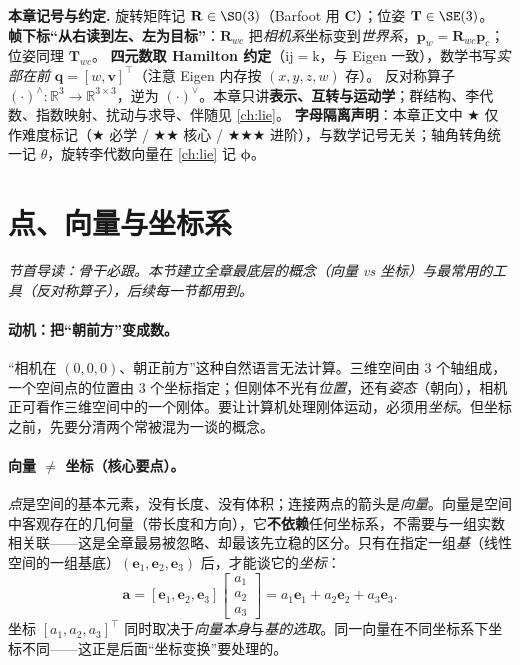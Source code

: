 \begin{note}
\textbf{本章记号与约定.}\;
旋转矩阵记 $\mathbf{R}\in\SO(3)$（Barfoot\cite{barfoot2024state} 用 $\mathbf{C}$）；位姿 $\mathbf{T}\in\SE(3)$。
\textbf{帧下标“从右读到左、左为目标”}：$\mathbf{R}_{wc}$ 把\emph{相机系}坐标变到\emph{世界系}，$\mathbf{p}_w=\mathbf{R}_{wc}\mathbf{p}_c$；位姿同理 $\mathbf{T}_{wc}$。
\textbf{四元数取 Hamilton 约定}（$\mathrm{ij}=\mathrm{k}$，与 Eigen 一致），数学书写\emph{实部在前} $\mathbf{q}=[w,\mathbf{v}]^\top$（注意 Eigen 内存按 $(x,y,z,w)$ 存）。
反对称算子 $(\cdot)^\wedge:\mathbb{R}^3\to\mathbb{R}^{3\times3}$，逆为 $(\cdot)^\vee$。本章只讲\textbf{表示、互转与运动学}；群结构、李代数、指数映射、扰动与求导、伴随见 \cref{ch:lie}。
\textbf{字母隔离声明}：本章正文中 $\bigstar$ 仅作难度标记（$\bigstar$ 必学 / $\bigstar\bigstar$ 核心 / $\bigstar\bigstar\bigstar$ 进阶），与数学记号无关；轴角转角统一记 $\theta$，旋转李代数向量在 \cref{ch:lie} 记 $\boldsymbol{\phi}$。
\end{note}

\section{点、向量与坐标系}
\label{sec:rb-vector}
\noindent\emph{节首导读：骨干必跟。本节建立全章最底层的概念（向量 vs 坐标）与最常用的工具（反对称算子），后续每一节都用到。}

\paragraph{动机：把“朝前方”变成数。}
“相机在 $(0,0,0)$、朝正前方”这种自然语言无法计算。三维空间由 $3$ 个轴组成，一个空间点的位置由 $3$ 个坐标指定；但刚体不光有\emph{位置}，还有\emph{姿态}（朝向），相机正可看作三维空间中的一个刚体\cite{gaoxiang2019slam14}。要让计算机处理刚体运动，必须用\emph{坐标}。但坐标之前，先要分清两个常被混为一谈的概念。

\paragraph{向量 $\neq$ 坐标（核心要点）。}
\emph{点}是空间的基本元素，没有长度、没有体积；连接两点的箭头是\emph{向量}。向量是空间中客观存在的几何量（带长度和方向），它\textbf{不依赖}任何坐标系，不需要与一组实数相关联——这是全章最易被忽略、却最该先立稳的区分\cite{gaoxiang2019slam14}。只有在指定一组\emph{基}（线性空间的一组基底）$(\mathbf{e}_1,\mathbf{e}_2,\mathbf{e}_3)$ 后，才能谈它的\emph{坐标}：
\begin{equation}
  \mathbf{a}=[\mathbf{e}_1,\mathbf{e}_2,\mathbf{e}_3]\begin{bmatrix}a_1\\a_2\\a_3\end{bmatrix}=a_1\mathbf{e}_1+a_2\mathbf{e}_2+a_3\mathbf{e}_3.
  \label{eq:coord}
\end{equation}
坐标 $[a_1,a_2,a_3]^\top$ 同时取决于\emph{向量本身}与\emph{基的选取}。同一向量在不同坐标系下坐标不同——这正是后面“坐标变换”要处理的。

